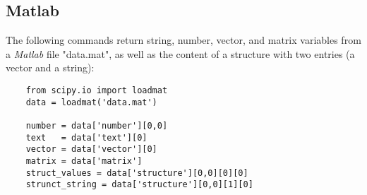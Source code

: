\subsection{Matlab}
The following commands return string, number, vector, and matrix variables from a \emph{Matlab} file "data.mat", as well as the content of a structure with two entries (a vector and a string):

\begin{lstlisting}
    from scipy.io import loadmat
    data = loadmat('data.mat')
    
    number = data['number'][0,0]
    text   = data['text'][0]
    vector = data['vector'][0]
    matrix = data['matrix']
    struct_values = data['structure'][0,0][0][0]
    strunct_string = data['structure'][0,0][1][0]
\end{lstlisting}

